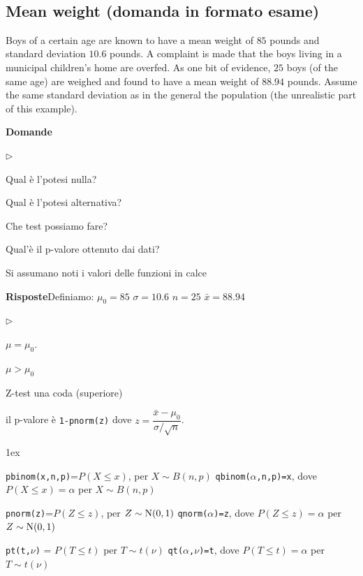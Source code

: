 \documentclass[11pt,openany]{book}
\newcommand{\mylabel}[1]{{\footnotesize\textsf{#1}}\hfill}
\renewenvironment{itemize}
  {\begin{list}{$\triangleright$}{%
   \setlength{\parskip}{0mm}
   \setlength{\topsep}{.2\baselineskip}
   \setlength{\rightmargin}{0mm}
   \setlength{\listparindent}{0mm}
   \setlength{\itemindent}{0mm}
   \setlength{\labelwidth}{3ex}
   \setlength{\itemsep}{.4\baselineskip}
   \setlength{\parsep}{0mm}
   \setlength{\partopsep}{0mm}
   \setlength{\labelsep}{1ex}
   \setlength{\leftmargin}{\labelwidth+\labelsep}
   \let\makelabel\mylabel}}{%
   \end{list}\vspace*{-1.3mm}}
\begin{document}



\clearpage\
\subsection{Mean weight (domanda in formato esame)}

Boys of a certain age are known to have a mean weight of $85$ pounds and standard deviation $10.6$ pounds. A complaint is made that the boys living in a municipal children's home are overfed. As one bit of evidence, $25$ boys (of the same age) are weighed and found to have a mean weight of $88.94$ pounds. Assume the same standard deviation as in the general the population (the unrealistic part of this example).


\textbf{Domande}

\begin{itemize}
\item[1.] Qual è l'potesi nulla?

\item[2.] Qual è l'potesi alternativa?

\item[3.] Che test possiamo fare?

\item[4.] Qual'è il p-valore ottenuto dai dati?
\end{itemize}

Si assumano noti i valori delle funzioni in calce

\textbf{Risposte}\quad Definiamo:\quad
$\mu_0=85$\quad
$\sigma=10.6$\quad
$n=25$\quad
$\bar x=88.94$
\begin{itemize}
\item[1.] $\mu=\mu_0$.
\item[2.] $\mu>\mu_0$ 
\item[3.] Z-test una coda (superiore)
\item[4.] il p-valore è {\tt 1-pnorm(z)} dove $z=\dfrac{\bar x-\mu_0}{\sigma/\sqrt{n}}$.
\end{itemize}

\vfill
\parskip1ex
{\hrulefill\scriptsize


{\tt pbinom(x,n,p)}=$P(X\le x)$, per $X\sim B(n,p)$
\hfill 
{\tt qbinom($\alpha$,n,p)=x},  dove $P(X\le x)=\alpha$ per $X\sim B(n,p)$

{\tt pnorm(z)}=$P(Z\le z)$, per $Z\sim {\rm N}(0,1)$
\hfill 
{\tt qnorm($\alpha$)=z},  dove $P(Z\le z)=\alpha$ per $Z\sim {\rm N}(0,1)$

{\tt pt(t,$\nu$)} = $P(T\le t)$ per $T\sim t(\nu)$
\hfill
{\tt qt($\alpha$,$\nu$)=t}, dove $P(T\le t)=\alpha$ per $T\sim t(\nu)$

}
\end{document}
